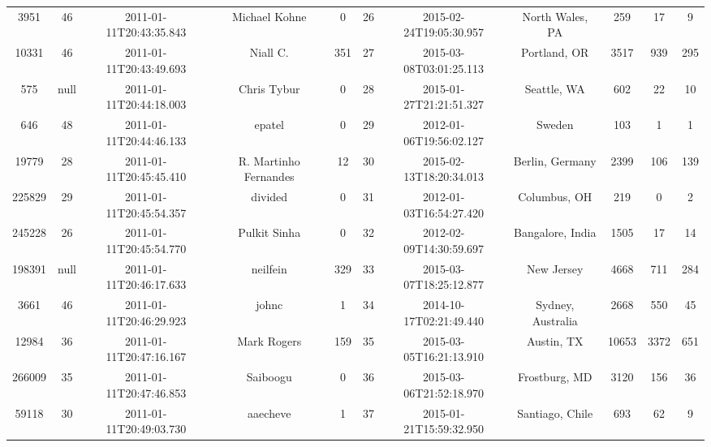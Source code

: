 \documentclass[12pt,a4paper,twoside,openright,titlepage,final]{article}
\begin{document}
\begin{landscape}
\begin{center}
\begin{longtable}{@{\extracolsep{\fill}}*{11}{c}}
			3951      & 46   & 2011-01-11T20:43:35.843 & Michael Kohne         & 0         & 26    & 2015-02-24T19:05:30.957 & North Wales, PA                  & 259        & 17      & 9     \\
			10331     & 46   & 2011-01-11T20:43:49.693 & Niall C.              & 351       & 27    & 2015-03-08T03:01:25.113 & Portland, OR                     & 3517       & 939     & 295   \\
			575       & null & 2011-01-11T20:44:18.003 & Chris Tybur           & 0         & 28    & 2015-01-27T21:21:51.327 & Seattle, WA                      & 602        & 22      & 10    \\
			646       & 48   & 2011-01-11T20:44:46.133 & epatel                & 0         & 29    & 2012-01-06T19:56:02.127 & Sweden                           & 103        & 1       & 1     \\
			19779     & 28   & 2011-01-11T20:45:45.410 & R. Martinho Fernandes & 12        & 30    & 2015-02-13T18:20:34.013 & Berlin, Germany                  & 2399       & 106     & 139   \\
			225829    & 29   & 2011-01-11T20:45:54.357 & divided               & 0         & 31    & 2012-01-03T16:54:27.420 & Columbus, OH                     & 219        & 0       & 2     \\
			245228    & 26   & 2011-01-11T20:45:54.770 & Pulkit Sinha          & 0         & 32    & 2012-02-09T14:30:59.697 & Bangalore, India                 & 1505       & 17      & 14    \\
			198391    & null & 2011-01-11T20:46:17.633 & neilfein              & 329       & 33    & 2015-03-07T18:25:12.877 & New Jersey                       & 4668       & 711     & 284   \\
			3661      & 46   & 2011-01-11T20:46:29.923 & johnc                 & 1         & 34    & 2014-10-17T02:21:49.440 & Sydney, Australia                & 2668       & 550     & 45    \\
			12984     & 36   & 2011-01-11T20:47:16.167 & Mark Rogers           & 159       & 35    & 2015-03-05T16:21:13.910 & Austin, TX                       & 10653      & 3372    & 651   \\
			266009    & 35   & 2011-01-11T20:47:46.853 & Saiboogu              & 0         & 36    & 2015-03-06T21:52:18.970 & Frostburg, MD                    & 3120       & 156     & 36    \\
			59118     & 30   & 2011-01-11T20:49:03.730 & aaecheve              & 1         & 37    & 2015-01-21T15:59:32.950 & Santiago, Chile                  & 693        & 62      & 9     \\

\end{longtable}
\end{center}
\end{landscape}
\end{document}
